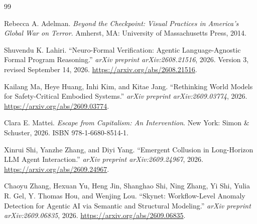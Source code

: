 \documentclass[11pt]{article}
\begin{document}
\begin{thebibliography}{99}

Rebecca A. Adelman.
\newblock \emph{Beyond the Checkpoint: Visual Practices in America's Global War on Terror}.
\newblock Amherst, MA: University of Massachusetts Press, 2014.

Shuvendu K. Lahiri.
\newblock ``Neuro-Formal Verification: Agentic Language-Agnostic Formal Program Reasoning.''
\newblock \emph{arXiv preprint arXiv:2608.21516}, 2026.
\newblock Version 3, revised September 14, 2026.
\newblock \url{https://arxiv.org/abs/2608.21516}.

Kailang Ma, Heye Huang, Inhi Kim, and Kitae Jang.
\newblock ``Rethinking World Models for Safety-Critical Embodied Systems.''
\newblock \emph{arXiv preprint arXiv:2609.03774}, 2026.
\newblock \url{https://arxiv.org/abs/2609.03774}.

Clara E. Mattei.
\newblock \emph{Escape from Capitalism: An Intervention}.
\newblock New York: Simon & Schuster, 2026.
\newblock ISBN 978-1-6680-8514-1.

Xinrui Shi, Yanzhe Zhang, and Diyi Yang.
\newblock ``Emergent Collusion in Long-Horizon LLM Agent Interaction.''
\newblock \emph{arXiv preprint arXiv:2609.24967}, 2026.
\newblock \url{https://arxiv.org/abs/2609.24967}.

Chaoyu Zhang, Hexuan Yu, Heng Jin, Shanghao Shi, Ning Zhang,
Yi Shi, Yulia R. Gel, Y. Thomas Hou, and Wenjing Lou.
\newblock ``Skynet: Workflow-Level Anomaly Detection for Agentic AI via
Semantic and Structural Modeling.''
\newblock \emph{arXiv preprint arXiv:2609.06835}, 2026.
\newblock \url{https://arxiv.org/abs/2609.06835}.

\end{thebibliography}
\end{document}
